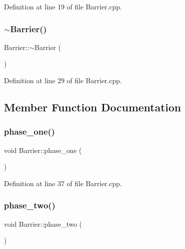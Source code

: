 Definition at line 19 of file Barrier.\+cpp.

\mbox{\label{class_barrier_a401f40e73302009b305904ffc7825304}} 
\subsubsection{\texorpdfstring{$\sim$\+Barrier()}{~Barrier()}}
{\footnotesize\ttfamily Barrier\+::$\sim$\+Barrier (\begin{DoxyParamCaption}{ }\end{DoxyParamCaption})\hspace{0.3cm}{\ttfamily [virtual]}}



Definition at line 29 of file Barrier.\+cpp.



\subsection{Member Function Documentation}
\mbox{\label{class_barrier_a5be6d04f7ecfad8c43f741ce5294ebc4}} 
\subsubsection{\texorpdfstring{phase\+\_\+one()}{phase\_one()}}
{\footnotesize\ttfamily void Barrier\+::phase\+\_\+one (\begin{DoxyParamCaption}{ }\end{DoxyParamCaption})}



Definition at line 37 of file Barrier.\+cpp.

\mbox{\label{class_barrier_a4bc5b771e10a8cf2cd136900f36f7055}} 
\subsubsection{\texorpdfstring{phase\+\_\+two()}{phase\_two()}}
{\footnotesize\ttfamily void Barrier\+::phase\+\_\+two (\begin{DoxyParamCaption}{ }\end{DoxyParamCaption})}



